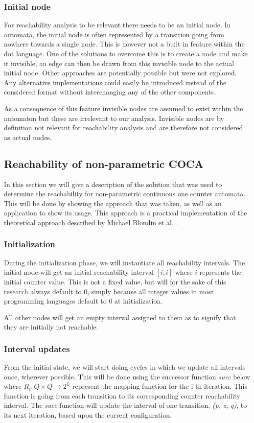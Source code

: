 \documentclass[12pt]{article}
\begin{document}
\subsubsection{Initial node}
For reachability analysis to be relevant there needs to be an initial node. In automata, the initial node is often represented by a transition going from nowhere towards a single node. This is however not a built in feature within the dot language. One of the solutions to overcome this is to create a node and make it invisible, an edge can then be drawn from this invisible node to the actual initial node. Other approaches are potentially possible but were not explored. Any alternative implementations could easily be introduced instead of the considered format without interchanging any of the other components.

As a consequence of this feature invisible nodes are assumed to exist within the automaton but these are irrelevant to our analysis. Invisible nodes are by definition not relevant for reachability analysis and are therefore not considered as actual nodes.

\subsection{Reachability of non-parametric COCA}
\label{sec:reachability non parametric}
In this section we will give a description of the solution that was used to determine the reachability for non-parametric continuous one counter automata. This will be done by showing the approach that was taken, as well as an application to show its usage. This approach is a practical implementation of the theoretical approach described by Michael Blondin et al. \cite{blondin2021continuous}.

\subsubsection{Initialization}
During the initialization phase, we will instantiate all reachability intervals. The initial node will get an initial reachability interval $[i, i]$ where $i$ represents the initial counter value. This is not a fixed value, but will for the sake of this research always default to 0, simply because all integer values in most programming languages default to 0 at initialization.

All other nodes will get an empty interval assigned to them as to signify that they are initially not reachable.

\subsubsection{Interval updates}
\label{interval updates}
From the initial state, we will start doing cycles in which we update all intervals once, wherever possible. This will be done using the successor function \textit{succ} below where $R_i: Q \times Q \rightarrow 2^\mathbb{Q}$ represent the mapping function for the i-th iteration. This function is going from each transition to its corresponding counter reachability interval. The \textit{succ} function will update the interval of one transition, \textit{(p, z, q)}, to its next iteration, based upon the current configuration.
\end{document}
